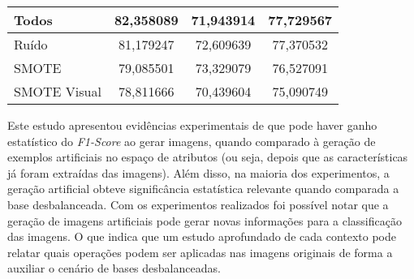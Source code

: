\begin{table}[!htbp]
\begin{tabular}{|l|c|c|c|}
Todos                                  & 82,358089                         & 71,943914                     & 77,729567      \\ \hline
Ruído                                  & 81,179247                         & 72,609639                     & 77,370532      \\ \hline
SMOTE                                  & 79,085501                         & 73,329079                     & 76,527091      \\ \hline
SMOTE Visual                           & 78,811666                         & 70,439604                     & 75,090749      \\ \hline
\end{tabular}
\end{table}


Este estudo apresentou evidências experimentais de que pode haver ganho estatístico do \textit{F1-Score} ao gerar imagens, quando comparado à geração de exemplos artificiais no espaço de atributos (ou seja, depois que as características já foram extraídas das imagens). Além disso, na maioria dos experimentos, a geração artificial obteve significância estatística relevante quando comparada a base desbalanceada. Com os experimentos realizados foi possível notar que a geração de imagens artificiais pode gerar novas informações para a classificação das imagens. O que indica que um estudo aprofundado de cada contexto pode relatar quais operações podem ser aplicadas nas imagens originais de forma a auxiliar o cenário de bases desbalanceadas.
